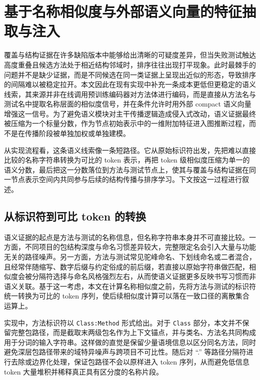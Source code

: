 \section{基于名称相似度与外部语义向量的特征抽取与注入}
\label{sec:sem_encoder_inject}

覆盖与结构证据在许多缺陷版本中能够给出清晰的可疑度差异，但当失败测试触达高度重叠且候选方法处于相近结构邻域时，排序往往出现打平现象。此时最棘手的问题并不是缺少证据，而是不同候选在同一类证据上呈现出近似的形态，导致排序的间隔难以被稳定拉开。本文因此在现有实现中补充一条成本更低但更稳定的语义线索，其来源并非在线调用预训练编码器对方法体进行编码，而是直接从方法名与测试名中提取名称层面的相似度信号，并在条件允许时用外部 compact 语义向量增强这一信号。为了避免语义模块对主干传播逻辑造成侵入式改动，语义证据最终被压缩为一个标量分数，作为节点初始表示中的一维附加特征进入图推断过程，而不是在传播阶段被单独加权或单独建模。

从实现流程看，这条语义线索像一条短路径。它从原始标识符出发，先把难以直接比较的名称字符串转换为可比的 token 表示，再把 token 级相似度压缩为单一的语义分数，最后把这一分数落位到方法与测试节点上，使其与覆盖与结构证据在同一节点表示空间内共同参与后续的结构传播与排序学习。下文按这一过程进行叙述。

\subsection{从标识符到可比 token 的转换}

语义证据的起点是方法与测试的名称信息，但名称字符串本身并不可直接比较。一方面，不同项目的包结构深度与命名习惯差异较大，完整限定名会引入大量与功能无关的路径噪声。另一方面，方法与测试常见驼峰命名、下划线命名或二者混合，且经常伴随缩写、数字后缀与约定俗成的前后缀，若直接以原始字符串做匹配，相似度会被分隔符选择与命名风格强烈左右，从而使语义证据更多反映书写习惯而非语义关联。基于这一考虑，本文在计算名称相似度之前，先将方法与测试的标识符统一转换为可比的 token 序列，使后续相似度计算可以落在一致口径的离散集合运算上。

实现中，方法标识符以 \texttt{Class:Method} 形式给出。对于 \texttt{Class} 部分，本文并不保留完整包路径，而是截取末两级包名作为上下文锚点，并与类名、方法名共同构成用于分词的输入字符串。这样做的直觉是保留少量语境信息以区分同名方法，同时避免深层包路径带来的域特异噪声与跨项目不可比性。随后对 ``.'' 等路径分隔符进行去除或边界化处理，保证包路径不会以原样进入 token 序列，从而避免低信息 token 大量堆积并稀释真正具有区分度的名称片段。

